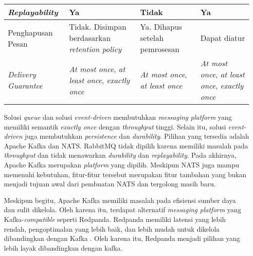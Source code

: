 \begin{longtable}{|p{}|p{}|p{}|p{}|}
    \hline
    \textit{Replayability}       & Ya                                                                   & Tidak                                         & Ya                                                                   \\
    \hline
    Penghapusan Pesan            & Tidak. Disimpan berdasarkan \textit{retention policy}                & Ya. Dihapus setelah pemrosesan                & Dapat diatur                                                         \\
    \hline
    \textit{Delivery Guarantee}  & \textit{At most once}, \textit{at least once}, \textit{exactly once} & \textit{At most once}, \textit{at least once} & \textit{At most once}, \textit{at least once}, \textit{exactly once} \\
    \hline
\end{longtable}
\endgroup

Solusi \textit{queue} dan solusi \textit{event-driven} membutuhkan \textit{messaging platform} yang memiliki semantik \textit{exactly once} dengan \textit{throughput} tinggi. Selain itu, solusi \textit{event-driven} juga membutuhkan \textit{persistence} dan \textit{durability}. Pilihan yang tersedia adalah Apache Kafka dan NATS. RabbitMQ tidak dipilih karena memiliki masalah pada \textit{throughput} dan tidak menawarkan \textit{durability} dan \textit{replayability}. Pada akhirnya, Apache Kafka merupakan \textit{platform} yang dipilih. Meskipun NATS juga mampu memenuhi kebutuhan, fitur-fitur tersebut merupakan fitur tambahan yang bukan menjadi tujuan awal dari pembuatan NATS dan tergolong masih baru.

Meskipun begitu, Apache Kafka memiliki masalah pada efisiensi sumber daya dan sulit dikelola. Oleh karena itu, terdapat alternatif \textit{messaging platform} yang Kafka-\textit{compatible} seperti Redpanda. Redpanda memiliki latensi yang lebih rendah, pengoptimalan yang lebih baik, dan lebih mudah untuk dikelola dibandingkan dengan Kafka \parencite{comparingKafkaAlternatives}. Oleh karena itu, Redpanda menjadi pilihan yang lebih layak dibandingkan dengan kafka.